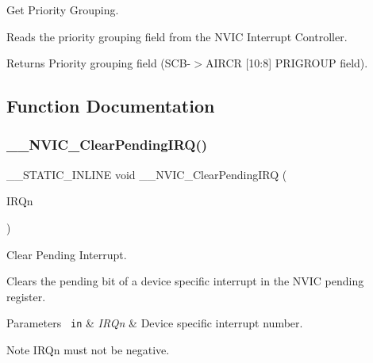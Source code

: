 Get Priority Grouping. 

Reads the priority grouping field from the N\+V\+IC Interrupt Controller. \begin{DoxyReturn}{Returns}
Priority grouping field (S\+C\+B-\/$>$A\+I\+R\+CR \mbox{[}10\+:8\mbox{]} P\+R\+I\+G\+R\+O\+UP field). 
\end{DoxyReturn}


\subsection{Function Documentation}
\mbox{\label{group___c_m_s_i_s___core___n_v_i_c_functions_ga562a86dbdf14827d0fee8fdafb04d191}} 
\subsubsection{\texorpdfstring{\_\_NVIC\_ClearPendingIRQ()}{\_\_NVIC\_ClearPendingIRQ()}}
{\footnotesize\ttfamily \+\_\+\+\_\+\+S\+T\+A\+T\+I\+C\+\_\+\+I\+N\+L\+I\+NE void \+\_\+\+\_\+\+N\+V\+I\+C\+\_\+\+Clear\+Pending\+I\+RQ (\begin{DoxyParamCaption}\item[{\mbox{\hyperlink{group___configuration__section__for___c_m_s_i_s_ga7e1129cd8a196f4284d41db3e82ad5c8}{I\+R\+Qn\+\_\+\+Type}}}]{I\+R\+Qn }\end{DoxyParamCaption})}



Clear Pending Interrupt. 

Clears the pending bit of a device specific interrupt in the N\+V\+IC pending register. 
\begin{DoxyParams}[1]{Parameters}
\mbox{\texttt{ in}}  & {\em I\+R\+Qn} & Device specific interrupt number. \\
\hline
\end{DoxyParams}
\begin{DoxyNote}{Note}
I\+R\+Qn must not be negative. 
\end{DoxyNote}
\mbox{\label{group___c_m_s_i_s___core___n_v_i_c_functions_gae016e4c1986312044ee768806537d52f}} 
